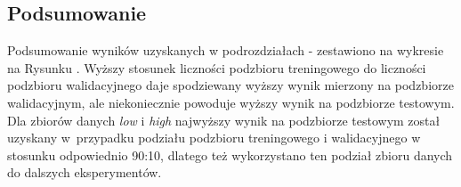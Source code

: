 \subsection{Podsumowanie}

Podsumowanie wyników uzyskanych w podrozdziałach - zestawiono na wykresie na Rysunku .
Wyższy stosunek liczności podzbioru treningowego do liczności podzbioru walidacyjnego daje spodziewany wyższy wynik mierzony na podzbiorze walidacyjnym, ale niekoniecznie powoduje wyższy wynik na podzbiorze testowym.
Dla zbiorów danych \textit{low} i \textit{high} najwyższy wynik na podzbiorze testowym został uzyskany w~przypadku podziału podzbioru treningowego i walidacyjnego w stosunku odpowiednio 90:10, dlatego też wykorzystano ten podział zbioru danych do dalszych eksperymentów.

\splitsummarydata

\vspace{0.5cm}

